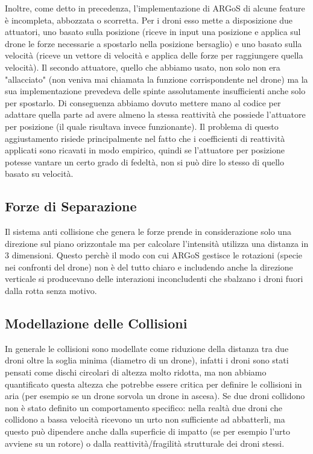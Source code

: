 \documentclass[a4paper,11pt,oneside, table]{article}
\begin{document}
Inoltre, come detto in precedenza, l'implementazione di ARGoS di alcune feature \`e incompleta, abbozzata o scorretta.
Per i droni esso mette a disposizione due attuatori, uno basato sulla posizione (riceve in input una posizione e applica sul drone le forze necessarie a spostarlo nella posizione bersaglio) e uno basato sulla velocit\`a (riceve un vettore di velocit\`a e applica delle forze per raggiungere quella velocit\`a).
Il secondo attuatore, quello che abbiamo usato, non solo non era "allacciato" (non veniva mai chiamata la funzione corrispondente nel drone) ma la sua implementazione prevedeva delle spinte assolutamente insufficienti anche solo per spostarlo.
Di conseguenza abbiamo dovuto mettere mano al codice per adattare quella parte ad avere almeno la stessa reattivit\`a che possiede l'attuatore per posizione (il quale risultava invece funzionante).
Il problema di questo aggiustamento risiede principalmente nel fatto che i coefficienti di reattivit\`a applicati sono ricavati in modo empirico, quindi se l'attuatore per posizione potesse vantare un certo grado di fedelt\`a, non si pu\`o dire lo stesso di quello basato su velocit\`a.

\subsection{Forze di Separazione}

Il sistema anti collisione che genera le forze prende in considerazione solo una direzione sul piano orizzontale ma per calcolare l'intensit\`a utilizza una distanza in 3 dimensioni.
Questo perch\`e il modo con cui ARGoS gestisce le rotazioni (specie nei confronti del drone) non \`e del tutto chiaro e includendo anche la direzione verticale si producevano delle interazioni inconcludenti che sbalzano i droni fuori dalla rotta senza motivo.

\subsection{Modellazione delle Collisioni}

In generale le collisioni sono modellate come riduzione della distanza tra due droni oltre la soglia minima (diametro di un drone), infatti i droni sono stati pensati come dischi circolari di altezza molto ridotta, ma non abbiamo quantificato questa altezza che potrebbe essere critica per definire le collisioni in aria (per esempio se un drone sorvola un drone in ascesa).
Se due droni collidono non \`e stato definito un comportamento specifico: nella realt\`a due droni che collidono a bassa velocit\`a ricevono un urto non sufficiente ad abbatterli, ma questo pu\`o dipendere anche dalla superficie di impatto (se per esempio l'urto avviene su un rotore) o dalla reattivit\`a/fragilit\`a strutturale dei droni stessi.
\end{document}
